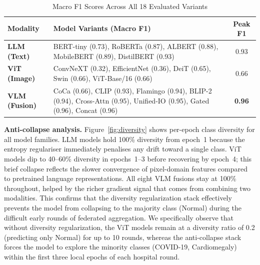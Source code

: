\documentclass[conference]{IEEEtran}
\begin{document}
\begin{table}[t]
\caption{Macro F1 Scores Across All 18 Evaluated Variants}
\label{tab:performance_variants}
\centering
\footnotesize
\renewcommand{\arraystretch}{1.2}
\begin{tabular}{p{1.8cm} p{5.2cm} c}
\toprule
\textbf{Modality} & \textbf{Model Variants (Macro F1)} & \textbf{Peak F1} \\
\midrule
\textbf{LLM (Text)} & BERT-tiny (0.73), RoBERTa (0.87), ALBERT (0.88), MobileBERT (0.89), DistilBERT (0.93) & 0.93 \\
\midrule
\textbf{ViT (Image)} & ConvNeXT (0.32), EfficientNet (0.36), DeiT (0.65), Swin (0.66), ViT-Base/16 (0.66) & 0.66 \\
\midrule
\textbf{VLM (Fusion)} & CoCa (0.66), CLIP (0.93), Flamingo (0.94), BLIP-2 (0.94), Cross-Attn (0.95), Unified-IO (0.95), Gated (0.96), Concat (0.96) & \textbf{0.96} \\
\bottomrule
\end{tabular}
\end{table}

\textbf{Anti-collapse analysis.}
Figure~\ref{fig:diversity} shows per-epoch class diversity for all
model families. LLM models hold 100\% diversity from epoch~1 because
the entropy regulariser immediately penalises any drift toward a
single class. ViT models dip to 40--60\% diversity in epochs~1--3
before recovering by epoch~4; this brief collapse reflects the slower
convergence of pixel-domain features compared to pretrained language
representations. All eight VLM fusions stay at 100\% throughout,
helped by the richer gradient signal that comes from combining two
modalities. This confirms that the diversity regularization stack
effectively prevents the model from collapsing to the majority class
(Normal) during the difficult early rounds of federated aggregation.
We specifically observe that without diversity regularization, the
ViT models remain at a diversity ratio of 0.2 (predicting only Normal)
for up to 10 rounds, whereas the anti-collapse stack forces the
model to explore the minority classes (COVID-19, Cardiomegaly) within
the first three local epochs of each hospital round.
\end{document}
